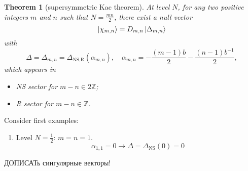 \documentclass[12pt]{article}
\newtheorem{theorem}{Theorem}[]
\theoremstyle{definition}
\begin{document}
\begin{theorem}[supersymmetric Kac theorem]
    At level $N$, for any two positive integers $m$ and $n$ such that $N = \frac{mn}{2}$, there exist a null vector
    \begin{equation}
        \ket{\chi_{m,n}}=D_{m,n}\ket{\Delta_{m,n}}
    \end{equation}
    with
    \begin{equation}
        \Delta=\Delta_{m,n}=\Delta_{\text{NS},\text{R}}(\alpha_{m,n}),\quad\alpha_{m,n}=-\frac{(m-1)b}{2}-\frac{(n-1)b^{-1}}{2},
    \end{equation}
    which appears in
    \begin{itemize}
        \item NS sector for $m-n\in2\mathbb{Z}$;
        \item R sector for $m-n\in\mathbb{Z}$.
    \end{itemize}
\end{theorem}
Consider first examples:
\begin{enumerate}
    \item Level $N=\frac{1}{2}$: $m=n=1$.\\
    \begin{equation}
        \alpha_{1,1}=0\rightarrow\Delta=\Delta_{\text{NS}}(0)=0
    \end{equation}

\end{enumerate}
ДОПИСАТь сингулярные векторы!
\end{document}
